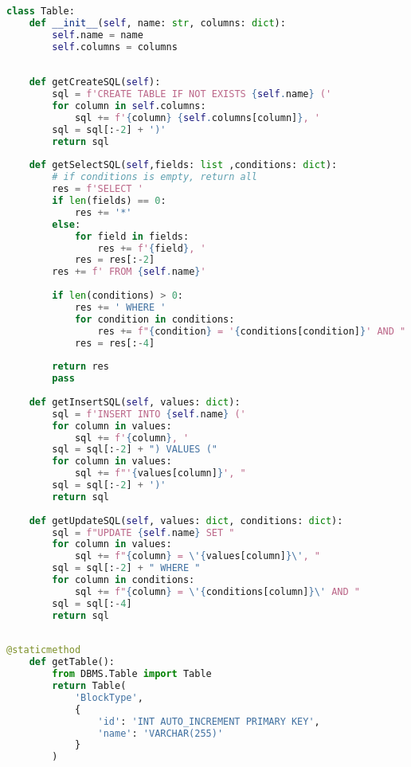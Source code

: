 \begin{lstlisting}[language=Python, caption={$\texttt{Table}$ class.}, label={lst:16}]
class Table:
    def __init__(self, name: str, columns: dict):
        self.name = name
        self.columns = columns
        
        
    def getCreateSQL(self):
        sql = f'CREATE TABLE IF NOT EXISTS {self.name} ('
        for column in self.columns:
            sql += f'{column} {self.columns[column]}, '
        sql = sql[:-2] + ')'
        return sql
    
    def getSelectSQL(self,fields: list ,conditions: dict):
        # if conditions is empty, return all
        res = f'SELECT '
        if len(fields) == 0:
            res += '*'
        else:
            for field in fields:
                res += f'{field}, '
            res = res[:-2]
        res += f' FROM {self.name}'
        
        if len(conditions) > 0:
            res += ' WHERE '
            for condition in conditions:
                res += f"{condition} = '{conditions[condition]}' AND "
            res = res[:-4]
            
        return res
        pass
    
    def getInsertSQL(self, values: dict):
        sql = f'INSERT INTO {self.name} ('
        for column in values:
            sql += f'{column}, '
        sql = sql[:-2] + ") VALUES ("
        for column in values:
            sql += f"'{values[column]}', "
        sql = sql[:-2] + ')'
        return sql
    
    def getUpdateSQL(self, values: dict, conditions: dict):
        sql = f"UPDATE {self.name} SET "
        for column in values:
            sql += f"{column} = \'{values[column]}\', "
        sql = sql[:-2] + " WHERE "
        for column in conditions:
            sql += f"{column} = \'{conditions[column]}\' AND "
        sql = sql[:-4]
        return sql
    
\end{lstlisting}

\begin{lstlisting}[language=Python, caption={$\texttt{getTable}$ function - BlockType class.}, label={lst:17}]
    @staticmethod
    def getTable():
        from DBMS.Table import Table
        return Table(
            'BlockType',
            {
                'id': 'INT AUTO_INCREMENT PRIMARY KEY',
                'name': 'VARCHAR(255)'
            }
        )
\end{lstlisting}

